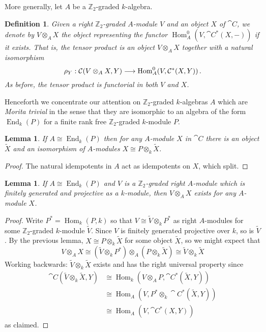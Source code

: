 \documentclass[english,letter paper,12pt,leqno]{article}
\newtheorem{lemma}[theorem]{Lemma}
\theoremstyle{example}
\newtheorem{definition}[theorem]{Definition}
\numberwithin{equation}{section}
\def\Hom{\operatorname{Hom}}
\DeclareMathOperator{\End}{End}
\begin{document}
More generally, let $A$ be a $\mathbb{Z}_2$-graded $k$-algebra.

\begin{definition} Given a right $\mathbb{Z}_2$-graded $A$-module $V$ and an object $X$ of $\cat{C}$, we denote by $V \otimes_A X$ the object representing the functor $\Hom^0_A( V, \cat{C}^*(X,-))$ if it exists. That is, the tensor product is an object $V \otimes_A X$ together with a natural isomorphism
\begin{equation}\label{eq:isodefatensor}
\rho_Y: \cat{C}(V \otimes_A X, Y) \lto \Hom^0_A( V, \cat{C}^*(X,Y))\,.
\end{equation}
As before, the tensor product is functorial in both $V$ and $X$.
\end{definition}

Henceforth we concentrate our attention on $\mathbb{Z}_2$-graded $k$-algebras $A$ which are \emph{Morita trivial} in the sense that they are isomorphic to an algebra of the form $\End_k(P)$ for a finite rank free $\mathbb{Z}_2$-graded $k$-module $P$.

\begin{lemma} If $A \cong \End_k(P)$ then for any $A$-module $X$ in $\cat{C}$ there is an object $\widetilde{X}$ and an isomorphism of $A$-modules $X \cong P \otimes_k \widetilde{X}$.
\end{lemma}
\begin{proof}
The natural idempotents in $A$ act as idempotents on $X$, which split.
\end{proof}

\begin{lemma} If $A \cong \End_k(P)$ and $V$ is a $\mathbb{Z}_2$-graded right $A$-module which is finitely generated and projective as a $k$-module, then $V \otimes_A X$ exists for any $A$-module $X$.
\end{lemma}
\begin{proof}
Write $P^* = \Hom_k(P,k)$ so that $V \cong \widetilde{V} \otimes_k P^*$ as right $A$-modules for some $\mathbb{Z}_2$-graded $k$-module $\widetilde{V}$. Since $V$ is finitely generated projective over $k$, so is $\widetilde{V}$. By the previous lemma, $X \cong P \otimes_k \widetilde{X}$ for some object $\widetilde{X}$, so we might expect that
\[
V \otimes_A X \cong (\widetilde{V} \otimes_k P^*) \otimes_A (P \otimes_k \widetilde{X}) \cong \widetilde{V} \otimes_k \widetilde{X}
\]
Working backwards: $\widetilde{V} \otimes_k \widetilde{X}$ exists and has the right universal property since
\begin{align*}
\cat{C}(\widetilde{V} \otimes_k \widetilde{X}, Y) &\cong \Hom_k( V \otimes_A P, \cat{C}^*(\widetilde{X}, Y))\\
&\cong \Hom_A( V, P^* \otimes_k \cat{C}^*(\widetilde{X}, Y))\\
&\cong \Hom_A( V, \cat{C}^*( X, Y ) )
\end{align*}
as claimed.
\end{proof}
\end{document}
